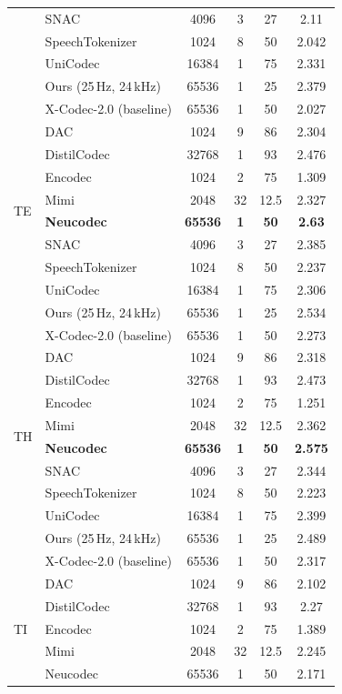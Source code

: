 \documentclass[preprint]{article}
\begin{document}
\begin{longtable}{llcccc}
  & SNAC & 4096 & 3 & 27 & 2.11 \\
  & SpeechTokenizer & 1024 & 8 & 50 & 2.042 \\
  & UniCodec & 16384 & 1 & 75 & 2.331 \\
  & Ours (25\,Hz, 24\,kHz) & 65536 & 1 & 25 & 2.379 \\
  & X-Codec-2.0 (baseline) & 65536 & 1 & 50 & 2.027 \\
\midrule
\multirow{8}{*}{TE}
  & DAC & 1024 & 9 & 86 & 2.304 \\
  & DistilCodec & 32768 & 1 & 93 & 2.476 \\
  & Encodec & 1024 & 2 & 75 & 1.309 \\
  & Mimi & 2048 & 32 & 12.5 & 2.327 \\
  & \textbf{Neucodec} & \textbf{65536} & \textbf{1} & \textbf{50} & \textbf{2.63} \\
  & SNAC & 4096 & 3 & 27 & 2.385 \\
  & SpeechTokenizer & 1024 & 8 & 50 & 2.237 \\
  & UniCodec & 16384 & 1 & 75 & 2.306 \\
  & Ours (25\,Hz, 24\,kHz) & 65536 & 1 & 25 & 2.534 \\
  & X-Codec-2.0 (baseline) & 65536 & 1 & 50 & 2.273 \\
\midrule
\multirow{8}{*}{TH}
  & DAC & 1024 & 9 & 86 & 2.318 \\
  & DistilCodec & 32768 & 1 & 93 & 2.473 \\
  & Encodec & 1024 & 2 & 75 & 1.251 \\
  & Mimi & 2048 & 32 & 12.5 & 2.362 \\
  & \textbf{Neucodec} & \textbf{65536} & \textbf{1} & \textbf{50} & \textbf{2.575} \\
  & SNAC & 4096 & 3 & 27 & 2.344 \\
  & SpeechTokenizer & 1024 & 8 & 50 & 2.223 \\
  & UniCodec & 16384 & 1 & 75 & 2.399 \\
  & Ours (25\,Hz, 24\,kHz) & 65536 & 1 & 25 & 2.489 \\
  & X-Codec-2.0 (baseline) & 65536 & 1 & 50 & 2.317 \\
\midrule
\multirow{8}{*}{TI}
  & DAC & 1024 & 9 & 86 & 2.102 \\
  & DistilCodec & 32768 & 1 & 93 & 2.27 \\
  & Encodec & 1024 & 2 & 75 & 1.389 \\
  & Mimi & 2048 & 32 & 12.5 & 2.245 \\
  & Neucodec & 65536 & 1 & 50 & 2.171 \\

\end{longtable}
\end{document}
